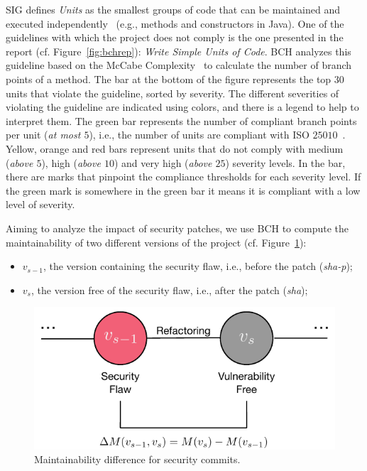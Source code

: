 \documentclass[smallextended]{svjour3}       %
\begin{document}
SIG defines \emph{Units} as the smallest groups of code that can be 
maintained and executed independently~\cite{Visser:2016:OREILLY} 
(e.g., methods and constructors in Java). One of the guidelines with 
which the project does not comply is the one presented in the report 
(cf. Figure~\ref{fig:bchrep}): \emph{Write Simple Units of Code}. BCH 
analyzes this guideline based on the McCabe 
Complexity~\cite{1702388} to calculate the number of branch points 
of a method. The bar at the bottom of the figure represents the top 
$30$ units that violate the guideline, sorted by severity. The 
different severities of violating the guideline are indicated using 
colors, and there is a legend to help to interpret them. The green 
bar represents the number of compliant branch points per unit 
(\emph{at most $5$}), i.e., the number of units are compliant with 
ISO $25010$~\cite{iso:2011}. Yellow, orange and red bars represent 
units that do not comply with medium (\emph{above $5$}), high 
(\emph{above $10$}) and very high (\emph{above $25$}) severity 
levels. In the bar, there are marks that pinpoint the compliance 
thresholds for each severity level. If the green mark is somewhere 
in the green bar it means it is compliant with a low level of
severity.



Aiming to analyze the impact of security patches, we use BCH to compute the maintainability of two different 
versions of the project (cf. Figure~\ref{fig:commit}):

\begin{itemize}
	\item $v_{s-1}$, the version containing the security flaw, i.e., 
	before the patch (\emph{sha-p});
	\item $v_{s}$, the version free of the security flaw, i.e., 
	after the patch (\emph{sha});
\end{itemize}

\begin{figure}[h]
 	\centering 	
	\includegraphics[width=0.5\linewidth]{figures/commit.pdf}
 	\caption{Maintainability difference for security commits.}
	\label{fig:commit}
\end{figure}
\end{document}
